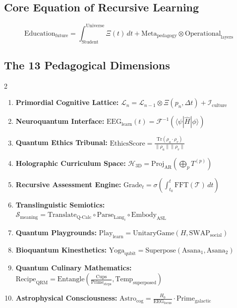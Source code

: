 \documentclass{article}
\theoremstyle{plain}
\theoremstyle{claimstyle}
\begin{document}
\subsection{Core Equation of Recursive Learning}
\begin{equation}
\text{Education}_{\text{future}} = \int_{\text{Student}}^{\text{Universe}} \Xi(t) \, dt + \text{Meta}_{\text{pedagogy}} \otimes \text{Operational}_{\text{layers}}
\end{equation}

\subsection{The 13 Pedagogical Dimensions}
\begin{multicols}{2}
\begin{enumerate}
    \item \textbf{Primordial Cognitive Lattice:} \( \mathcal{L}_n = \mathcal{L}_{n-1} \otimes \Xi(p_n, \Delta t) + \mathcal{I}_{\text{culture}} \)
    \item \textbf{Neuroquantum Interface:} \( \text{EEG}_{\text{learn}}(t) = \mathcal{F}^{-1}(\langle \psi | \hat{H} | \phi \rangle) \)
    \item \textbf{Quantum Ethics Tribunal:} \( \text{EthicsScore} = \frac{\text{Tr}(\rho_a \cdot \rho_v)}{\|\rho_a\|\|\rho_v\|} \)
    \item \textbf{Holographic Curriculum Space:} \( \mathcal{H}_{\text{3D}} = \text{Proj}_{\text{AR}}\left(\bigoplus_{p} T^{(p)}\right) \)
    \item \textbf{Recursive Assessment Engine:} \( \text{Grade}_t = \sigma\left( \int_{t_0}^t \text{FFT}(\mathcal{T}) \, dt \right) \)
    \item \textbf{Translinguistic Semiotics:} \( \mathcal{S}_{\text{meaning}} = \text{Translate}_{\text{Q-Calc}} \circ \text{Parse}_{\text{Lang}_i} \circ \text{Embody}_{\text{ASL}} \)
    \item \textbf{Quantum Playgrounds:} \( \text{Play}_{\text{learn}} = \text{UnitaryGame}(H, \text{SWAP}_{\text{social}}) \)
    \item \textbf{Bioquantum Kinesthetics:} \( \text{Yoga}_{\text{qubit}} = \text{Superpose}(\text{Asana}_1, \text{Asana}_2) \)
    \item \textbf{Quantum Culinary Mathematics:} \( \text{Recipe}_{\text{QRM}} = \text{Entangle}( \frac{\text{Cups}}{\text{Prime}_{\text{steps}}}, \text{Temp}_{\text{superposed}} ) \)
    \item \textbf{Astrophysical Consciousness:} \( \text{Astro}_{\text{cog}} = \frac{H_0}{\text{EEG}_{\text{focus}}} \cdot \text{Prime}_{\text{galactic}} \)

\end{enumerate}
\end{multicols}
\end{document}
